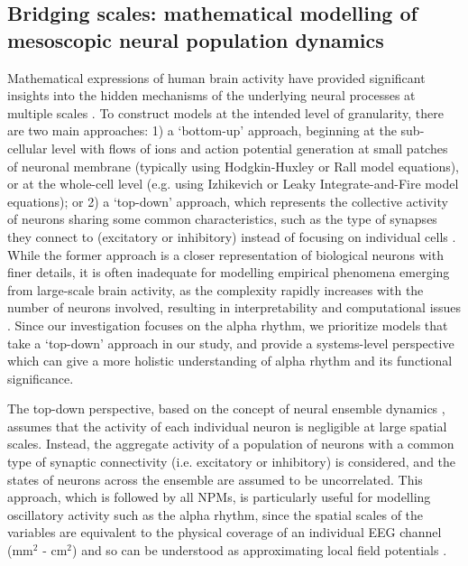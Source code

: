 \documentclass[12pt,twoside]{article}
\begin{document}
\subsection{Bridging scales: mathematical modelling of mesoscopic neural population dynamics}
Mathematical expressions of human brain activity have provided significant insights into the hidden mechanisms of the underlying neural processes at multiple scales \citep{deco2008dynamic}. To construct models at the intended level of granularity, there are two main approaches: 1) a `bottom-up' approach, beginning at the sub-cellular level with flows of ions and action potential generation at small patches of neuronal membrane (typically using Hodgkin-Huxley or Rall model equations), or at the whole-cell level (e.g. using Izhikevich or Leaky Integrate-and-Fire model equations); or 2) a `top-down' approach, which represents the collective activity of neurons sharing some common characteristics, such as the type of synapses they connect to (excitatory or inhibitory) instead of focusing on individual cells \citep{cook2021neural, cooray2023global}. While the former approach is a closer representation of biological neurons with finer details, it is often inadequate for modelling empirical phenomena emerging from large-scale brain activity, as the complexity rapidly increases with the number of neurons involved, resulting in interpretability and computational issues \citep{cook2021neural}. Since our investigation focuses on the alpha rhythm, we prioritize models that take a `top-down' approach in our study, and provide a systems-level perspective which can give a more holistic understanding of alpha rhythm and its functional significance.

The top-down perspective, based on the concept of neural ensemble dynamics \citep{breakspear2017dynamic}, assumes that the activity of each individual neuron is negligible at large spatial scales. Instead, the aggregate activity of a population of neurons with a common type of synaptic connectivity (i.e. excitatory or inhibitory) is considered, and the states of neurons across the ensemble are assumed to be uncorrelated. This approach, which is followed by all NPMs, is particularly useful for modelling oscillatory activity such as the alpha rhythm, since the spatial scales of the variables are equivalent to the physical coverage of an individual EEG channel (mm$^2$ - cm$^2$) and so can be understood as approximating local field potentials \citep{coombes2014neural, evertz2022alpha}. 
\end{document}
